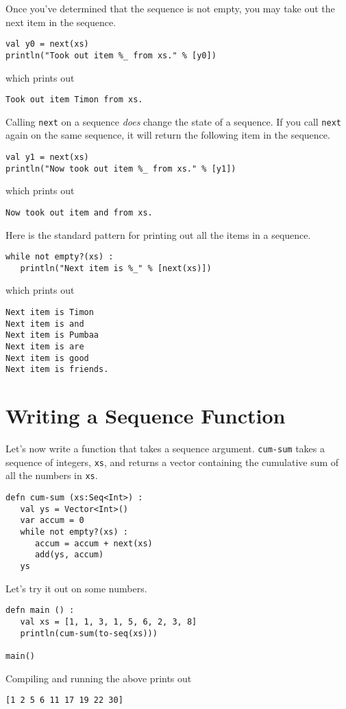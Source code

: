 \documentclass[10pt,oneside]{book}
\begin{document}
Once you've determined that the sequence is not empty, you may take out the next item in the sequence.
\begin{lstlisting}
val y0 = next(xs)
println("Took out item %_ from xs." % [y0])
\end{lstlisting}
which prints out
\begin{lstlisting}
Took out item Timon from xs.
\end{lstlisting}

Calling \texttt{\frenchspacing next} on a sequence {\em does} change the state of a sequence. If you call \texttt{\frenchspacing next} again on the same sequence, it will return the following item in the sequence.
\begin{lstlisting}
val y1 = next(xs)
println("Now took out item %_ from xs." % [y1])
\end{lstlisting}
which prints out
\begin{lstlisting}
Now took out item and from xs.
\end{lstlisting}

Here is the standard pattern for printing out all the items in a sequence. 
\begin{lstlisting}
while not empty?(xs) :
   println("Next item is %_" % [next(xs)])
\end{lstlisting}
which prints out
\begin{lstlisting}
Next item is Timon
Next item is and
Next item is Pumbaa
Next item is are
Next item is good
Next item is friends.
\end{lstlisting}

\section{Writing a Sequence Function}
Let's now write a function that takes a sequence argument. \texttt{\frenchspacing cum-sum} takes a sequence of integers, \texttt{\frenchspacing xs}, and returns a vector containing the cumulative sum of all the numbers in \texttt{\frenchspacing xs}.
\begin{lstlisting}
defn cum-sum (xs:Seq<Int>) :
   val ys = Vector<Int>()
   var accum = 0
   while not empty?(xs) :      
      accum = accum + next(xs)
      add(ys, accum)
   ys
\end{lstlisting}
Let's try it out on some numbers.
\begin{lstlisting}
defn main () :
   val xs = [1, 1, 3, 1, 5, 6, 2, 3, 8]
   println(cum-sum(to-seq(xs)))

main()
\end{lstlisting}
Compiling and running the above prints out
\begin{lstlisting}
[1 2 5 6 11 17 19 22 30]
\end{lstlisting}
\end{document}
